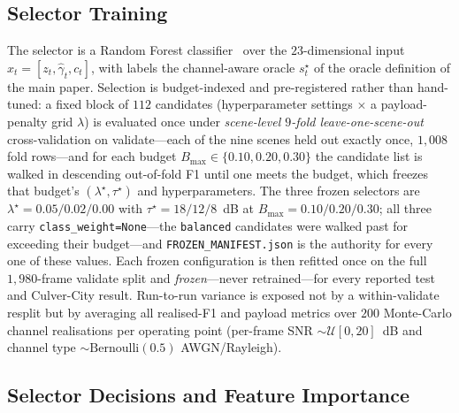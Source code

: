 \documentclass[journal]{IEEEtran}
\begin{document}
\subsection{Selector Training}

The selector is a Random Forest classifier~\cite{breiman2001random} over the $23$-dimensional input $x_t = [z_t,\hat\gamma_t,c_t]$, with labels the channel-aware oracle $s_t^\star$ of the oracle definition of the main paper. Selection is budget-indexed and pre-registered rather than hand-tuned: a fixed block of $112$ candidates (hyperparameter settings $\times$ a payload-penalty grid $\lambda$) is evaluated once under \emph{scene-level $9$-fold leave-one-scene-out} cross-validation on validate---each of the nine scenes held out exactly once, $1{,}008$ fold rows---and for each budget $B_{\max}\in\{0.10,0.20,0.30\}$ the candidate list is walked in descending out-of-fold F1 until one meets the budget, which freezes that budget's $(\lambda^\star,\tau^\star)$ and hyperparameters. The three frozen selectors are $\lambda^\star = 0.05/0.02/0.00$ with $\tau^\star = 18/12/8$~dB at $B_{\max}=0.10/0.20/0.30$; all three carry \texttt{class\_weight=None}---the \texttt{balanced} candidates were walked past for exceeding their budget---and \texttt{FROZEN\_MANIFEST.json} is the authority for every one of these values. Each frozen configuration is then refitted once on the full $1{,}980$-frame validate split and \emph{frozen}---never retrained---for every reported test and Culver-City result. Run-to-run variance is exposed not by a within-validate resplit but by averaging all realised-F1 and payload metrics over $200$ Monte-Carlo channel realisations per operating point (per-frame SNR $\sim\mathcal{U}[0,20]$~dB and channel type $\sim\mathrm{Bernoulli}(0.5)$ AWGN/Rayleigh).



\subsection{Selector Decisions and Feature Importance}\label{sec:decision_ratio}
\end{document}
